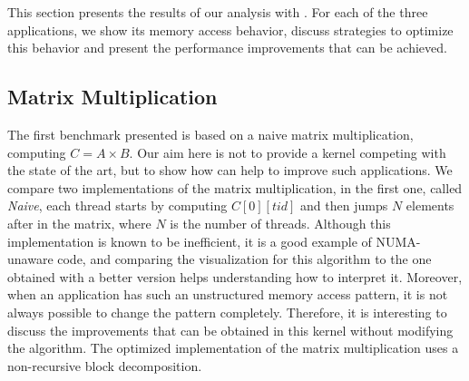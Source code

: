 This section presents the results of our analysis with \TABARNAC.
For each of the three applications, we show its memory access behavior, discuss strategies to optimize this behavior and present the performance improvements that can be achieved.


\subsection{Matrix Multiplication}
\label{sec:exp-mat}

The first benchmark presented is based on a naive matrix multiplication,
computing $C=A \times B$. Our aim here is not to provide a kernel competing with the
state of the art, but to show how \TABARNAC can help to improve such
applications. We compare two implementations of the matrix multiplication, in
the first one, called \emph{Naive}, each thread starts by computing
$C[0][tid]$ and then jumps $N$ elements after in the matrix, where $N$ is the
number of threads. Although this implementation is known to be inefficient, it is a
good example of NUMA-unaware code, and comparing the \TABARNAC visualization
for this algorithm to the one obtained with a better version helps understanding
how to interpret it.
Moreover, when an application has such an unstructured memory access pattern, it
is not always possible to change the pattern completely. Therefore, it is
interesting to discuss the improvements that can be obtained in this kernel without
modifying the algorithm.
The optimized implementation of the matrix multiplication uses a non-recursive block
decomposition.



